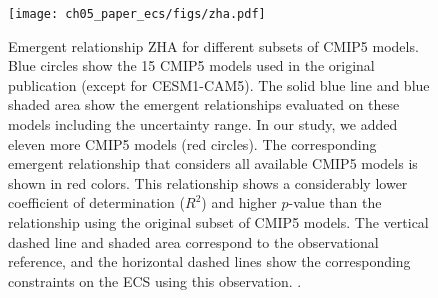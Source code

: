 \begin{figure}[t]
  \centering
  \texttt{[image: ch05\_paper\_ecs/figs/zha.pdf]}
  \caption[
    Emergent relationship ZHA for different subsets of \acs{CMIP}5 models.
  ]{
    Emergent relationship ZHA \autocite{Zhai2015} for different subsets of
    \acs{CMIP}5 models. Blue circles show the 15 \acs{CMIP}5 models used in the
    original publication (except for \acs{CESM}1-CAM5). The solid blue line and
    blue shaded area show the emergent relationships evaluated on these models
    including the uncertainty range. In our study, we added eleven more
    \acs{CMIP}5 models (red circles). The corresponding emergent relationship
    that considers all available \acs{CMIP}5 models is shown in red colors.
    This relationship shows a considerably lower coefficient of determination
    ($R^2$) and higher $p$-value than the relationship using the original
    subset of \acs{CMIP}5 models. The vertical dashed line and shaded area
    correspond to the observational reference, and the horizontal dashed lines
    show the corresponding constraints on the \acf{ECS} using this observation.
    .
  }
  \label{fig:05:zha}
\end{figure}

